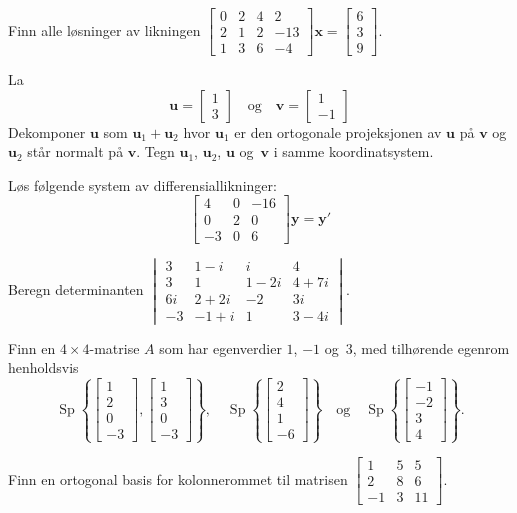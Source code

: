 \documentclass[titlepage,a4paper,12pt,norsk]{IMFeksamen}
\DeclareMathOperator{\Sp}{Sp}
\newcommand{\V}[1]{\mathbf{#1}}
\newcommand{\vv}[2]{\begin{bmatrix} #1 \\ #2 \end{bmatrix}}
\newcommand{\vvv}[3]{\begin{bmatrix} #1 \\ #2 \\ #3 \end{bmatrix}}
\newcommand{\vvvv}[4]{\begin{bmatrix} #1 \\ #2 \\ #3 \\ #4 \end{bmatrix}}
\newcommand{\x}{\V{x}}
\newcommand{\0}{\V{0}}
\begin{document}
\begin{oppgave}
Finn alle løsninger av likningen
$
\begin{bmatrix}
0 & 2 & 4 &   2 \\
2 & 1 & 2 & -13 \\
1 & 3 & 6 &  -4
\end{bmatrix}
\x
= \vvv{6}{3}{9}
$.
\end{oppgave}


\begin{oppgave}
La
\[
\V u= \vv{1}{3} \quad \text{og} \quad \V v=\vv{1}{-1}
\]
Dekomponer $\V u$ som $\V{u}_1+\V{u}_2$ hvor $\V{u}_1$ er den ortogonale projeksjonen av $\V u$ på $\V v$ og $\V{u}_2$ står normalt på $\V v$. Tegn  $\V{u}_1$,  $\V{u}_2$, $\V u$ og~$\V v$ i samme koordinatsystem. 
\end{oppgave}


\begin{oppgave}
Løs følgende system av differensiallikninger:
\[
\begin{bmatrix}
4 & 0 & -16 \\
  0 & 2 & 0 \\
-3 & 0 & 6
\end{bmatrix}
\V{y}
= \V{y}'
\]
\end{oppgave}


\begin{oppgave}
Beregn determinanten
$
\begin{vmatrix}
 3 &  1 - i  & i      & 4      \\
 3 &  1      & 1 - 2i & 4 + 7i \\
6i &  2 + 2i & -2     & 3i     \\
-3 & -1 + i  & 1      & 3 - 4i
\end{vmatrix}
$.
\end{oppgave}


\begin{oppgave}
Finn en $4 \times 4$-matrise $A$ som har egenverdier $1$, $-1$ og~$3$,
med tilhørende egenrom henholdsvis
\[
\Sp \left\{ \vvvv{1}{2}{0}{-3}, \vvvv{1}{3}{0}{-3} \right\},\quad
\Sp \left\{ \vvvv{2}{4}{1}{-6} \right\}
\quad\text{og}\quad
\Sp \left\{ \vvvv{-1}{-2}{3}{4} \right\}.
\]
\end{oppgave}


\begin{oppgave}
Finn en ortogonal basis for kolonnerommet til matrisen
$
\begin{bmatrix}
1 & 5 & 5 \\
2 & 8 & 6 \\
-1 & 3 & 11
\end{bmatrix}
$.
\end{oppgave}
\end{document}
